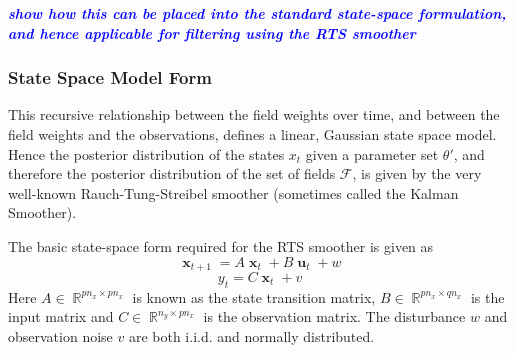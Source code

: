 \documentclass{IEEEtran}
\newcommand{\todo}[1]{\textsf{\emph{\textbf{\textcolor{blue}{#1}}}}}
\DeclareMathOperator{\R}{\mathbb{R}}
\DeclareMathOperator{\xvec}{\mathbf{x}}
\DeclareMathOperator{\uvec}{\mathbf{u}}
\begin{document}
\todo{show how this can be placed into the standard state-space formulation, and hence applicable for filtering using the RTS smoother}

\subsubsection{State Space Model Form}

This recursive relationship between the field weights over time, and between the field weights and the observations, defines a linear, Gaussian state space model. Hence the posterior distribution of the states $x_t$ given a parameter set $\theta'$, and therefore the posterior distribution of the set of fields $\mathcal{F}$, is given by the very well-known Rauch-Tung-Streibel smoother (sometimes called the Kalman Smoother).

The basic state-space form required for the RTS smoother is given as
\begin{equation}
	\label{eqn:ssmodel_hidden}
	\xvec_{t+1} = A\xvec_t + B\uvec_t + w
\end{equation}
\begin{equation}
	\label{eqn:ssmodel_observations}
	y_t = C\xvec_t + v
\end{equation}
Here $A \in \R^{pn_{x} \times pn_x}$ is known as the state transition matrix, $B \in \R^{pn_x \times qn_x}$ is the input matrix and $C \in \R^{n_y \times pn_x}$ is the observation matrix. The disturbance $w$ and observation noise $v$ are both i.i.d. and normally distributed. 
\end{document}
